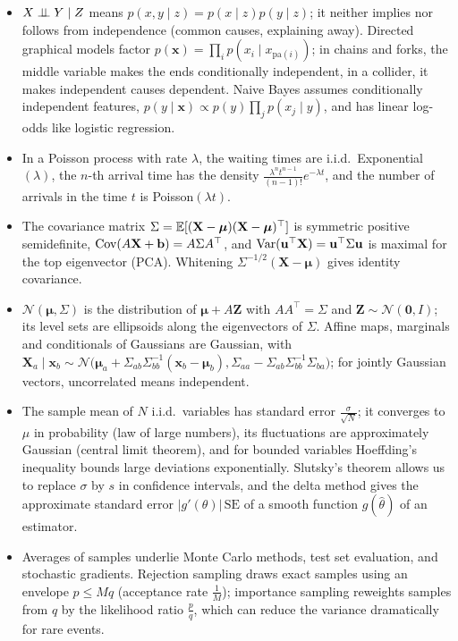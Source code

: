 \begin{itemize}[leftmargin=*]
    \item $X \perp\!\!\!\perp Y \mid Z$ means $p(x, y \mid z) = p(x \mid z)p(y \mid z)$; it neither implies nor follows from independence (common causes, explaining away). Directed graphical models factor $p(\mathbf{x}) = \prod_i p(x_i \mid x_{\mathrm{pa}(i)})$; in chains and forks, the middle variable makes the ends conditionally independent, in a collider, it makes independent causes dependent. Naive Bayes assumes conditionally independent features, $p(y \mid \mathbf{x}) \propto p(y)\prod_j p(x_j \mid y)$, and has linear log-odds like logistic regression.
    \item In a Poisson process with rate $\lambda$, the waiting times are i.i.d.\ Exponential$(\lambda)$, the $n$-th arrival time has the density $\frac{\lambda^nt^{n-1}}{(n - 1)!}e^{-\lambda t}$, and the number of arrivals in the time $t$ is Poisson$(\lambda t)$.
    \item The covariance matrix $\Sigma = \mathbb{E}[(\mathbf{X} - \boldsymbol{\mu})(\mathbf{X} - \boldsymbol{\mu})^\top]$ is symmetric positive semidefinite, $\operatorname{Cov}(A\mathbf{X} + \mathbf{b}) = A\Sigma A^\top$, and $\operatorname{Var}(\mathbf{u}^\top\mathbf{X}) = \mathbf{u}^\top\Sigma\mathbf{u}$ is maximal for the top eigenvector (PCA). Whitening $\Sigma^{-1/2}(\mathbf{X} - \boldsymbol{\mu})$ gives identity covariance.
    \item $\mathcal{N}(\boldsymbol{\mu}, \Sigma)$ is the distribution of $\boldsymbol{\mu} + A\mathbf{Z}$ with $AA^\top = \Sigma$ and $\mathbf{Z} \sim \mathcal{N}(\mathbf{0}, I)$; its level sets are ellipsoids along the eigenvectors of $\Sigma$. Affine maps, marginals and conditionals of Gaussians are Gaussian, with $\mathbf{X}_a \mid \mathbf{x}_b \sim \mathcal{N}\big(\boldsymbol{\mu}_a + \Sigma_{ab}\Sigma_{bb}^{-1}(\mathbf{x}_b - \boldsymbol{\mu}_b), \Sigma_{aa} - \Sigma_{ab}\Sigma_{bb}^{-1}\Sigma_{ba}\big)$; for jointly Gaussian vectors, uncorrelated means independent.
    \item The sample mean of $N$ i.i.d.\ variables has standard error $\frac{\sigma}{\sqrt{N}}$; it converges to $\mu$ in probability (law of large numbers), its fluctuations are approximately Gaussian (central limit theorem), and for bounded variables Hoeffding's inequality bounds large deviations exponentially. Slutsky's theorem allows us to replace $\sigma$ by $s$ in confidence intervals, and the delta method gives the approximate standard error $|g'(\theta)|\,\mathrm{SE}$ of a smooth function $g(\hat\theta)$ of an estimator.
    \item Averages of samples underlie Monte Carlo methods, test set evaluation, and stochastic gradients. Rejection sampling draws exact samples using an envelope $p \leq Mq$ (acceptance rate $\frac{1}{M}$); importance sampling reweights samples from $q$ by the likelihood ratio $\frac{p}{q}$, which can reduce the variance dramatically for rare events.

\end{itemize}
